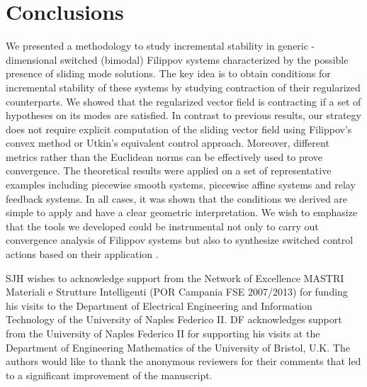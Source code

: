 \documentclass[twocolumn]{autart}
\begin{document}
\section{Conclusions}
\label{sec:conclusions}
We presented a methodology to study incremental stability in generic -dimensional switched (bimodal) Filippov systems characterized by the possible presence of sliding mode solutions. The key idea is to obtain conditions for incremental stability of these systems by studying contraction of their regularized counterparts. We showed that the regularized vector field is contracting if a set of hypotheses on its modes are satisfied. In contrast to previous results, our strategy does not require explicit computation of the sliding vector field using Filippov's convex method or Utkin's equivalent control approach. Moreover, different metrics rather than the Euclidean norms can be effectively used to prove convergence. The theoretical results were applied on a set of representative examples including piecewise smooth systems, piecewise affine systems and relay feedback systems. In all cases, it was shown that the conditions we derived are simple to apply and have a clear geometric interpretation. We wish to emphasize that the tools we developed could be instrumental not only to carry out convergence analysis of Filippov systems but also to synthesize switched control actions based on their application \citep{di2015switching}.
\begin{ack}                               
SJH wishes to acknowledge support from the Network of Excellence MASTRI Materiali e Strutture Intelligenti (POR Campania FSE 2007/2013) for funding his visits to the Department of Electrical Engineering and Information Technology of the University of Naples Federico II. DF acknowledges support from the University of Naples Federico II for supporting his visits at the Department of Engineering Mathematics of the University of Bristol, U.K. The authors would like to thank the anonymous reviewers for their comments that led to a significant improvement of the manuscript.
\end{ack}

                   
\end{document}

